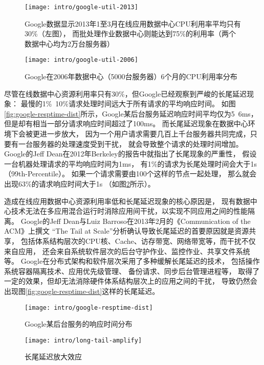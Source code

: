 \begin{figure}
\begin{minipage}{0.57\textwidth}
  \centering
  \texttt{[image: intro/google-util-2013]}
  \caption[Google数据中心CPU利用率分布（2013年）]
    {Google数据显示2013年1至3月在线应用数据中心CPU利用率平均只有30\%（左图），
     而批处理作业数据中心则能达到75\%的利用率（两个数据中心均为2万台服务器）}
  \label{fig:google-util-2013}
\end{minipage}\hfill
\begin{minipage}{0.39\textwidth}
  \centering
  \texttt{[image: intro/google-util-2006]}
  \caption[Google数据中心CPU利用率分布（2006年）]
    {Google在2006年数据中心（5000台服务器）6个月的CPU利用率分布}
  \label{fig:google-util-2006}
\end{minipage}
\end{figure}

尽管在线数据中心资源利用率只有30\%，但Google已经观察到严峻的长尾延迟现象：
最慢的1\%~10\%请求处理时间远大于所有请求的平均响应时间。
如图\ref{fig:google-resptime-dist}所示，Google某后台服务延迟响应时间平均仅为5~6ms，
但是却有相当一部分请求响应时间超过了100ms\cite{Krushevskaja:2013}。
而长尾延迟现象在数据中心环境下会被更进一步放大，
因为一个用户请求需要几百上千台服务器共同完成，只要有一台服务器的处理速度受到干扰，
就会导致整个请求的处理时间增加。
Google的Jeff Dean在2012年Berkeley的报告\cite{dean_achieving_2012}中就指出了长尾现象的严重性，
假设一台机器处理请求的平均响应时间为1ms，
有1\%的请求为长尾处理时间会大于1s（99th-Percentile）。
如果一个请求需要由100个这样的节点一起处理，
那么就会出现63\%的请求响应时间大于1s
（如图\ref{fig:long-tail-amplify}所示）。

造成在线应用数据中心资源利用率低和长尾延迟现象的核心原因是，
现有数据中心技术无法在多应用混合运行时消除应用间干扰，以实现不同应用之间的性能隔离。
Google的Jeff Dean与Luiz Barroso在2013年2月的《Communication of the ACM》上撰文
“The Tail at Scale”\cite{dean_tail_2013}分析确认导致长尾延迟的首要原因就是资源共享，
包括体系结构层次的CPU核、Cache、访存带宽、网络带宽等，而干扰不仅来自应用，
还会来自系统软件层次的后台守护作业、监控作业、共享文件系统等。
Google在分布式架构和软件层次采用了多种缓解长尾延迟的技术，
包括操作系统容器隔离技术\cite{cgroup}、应用优先级管理\cite{google_trace}、
备份请求\cite{dean_achieving_2012}、同步后台管理进程\cite{dean_achieving_2012}等，
取得了一定的效果，但却无法消除硬件体系结构层次上的应用之间的干扰，
导致仍然会出现图\ref{fig:google-resptime-dist}这样的长尾延迟。

\begin{figure}
\begin{minipage}{0.44\textwidth}
  \centering
  \texttt{[image: intro/google-resptime-dist]}
  \caption[Google某后台服务的响应时间分布]{Google某后台服务的响应时间分布\cite{Krushevskaja:2013}}
  \label{fig:google-resptime-dist}
\end{minipage}\hfill
\begin{minipage}{0.52\textwidth}
  \centering
  \texttt{[image: intro/long-tail-amplify]}
  \caption[长尾延迟放大效应]{长尾延迟放大效应\cite{dean_tail_2013}}
  \label{fig:long-tail-amplify}
\end{minipage}
\end{figure}

